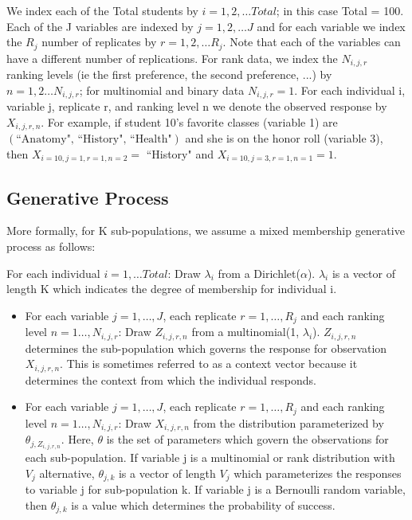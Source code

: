 \documentclass{article}
\begin{document}
We index each of the Total students by $i = 1,2, \ldots Total$; in this case Total = 100. Each of the J variables are indexed by $j = 1,2,\ldots J$ and for each variable we index the $R_j$ number of replicates by $r = 1,2,\ldots R_j$. Note that each of the variables can have a different number of replications. For rank data, we index the $N_{i,j,r}$ ranking levels (ie the first preference, the second preference, ...) by $n = 1,2\ldots N_{i,j,r}$; for multinomial and binary data $N_{i,j,r} = 1$. For each individual i, variable j, replicate r, and ranking level n we denote the observed response by $X_{i,j,r,n}$. For example, if student 10's favorite classes (variable 1)  are $ \left(\text{``Anatomy", ``History", ``Health"}\right)$ and she is on the honor roll (variable 3), then $X_{i = 10,j = 1,r = 1,n = 2} =$ ``History" and  $X_{i = 10,j = 3,r = 1,n = 1} = 1$.    

\subsection{Generative Process}\label{generative}
More formally, for K sub-populations, we assume a mixed membership generative process as follows:

\noindent
For each individual $i = 1,\ldots Total$: Draw $\lambda_i$ from a Dirichlet($\alpha$). $\lambda_i$ is a vector of length K which indicates the degree of membership for individual i.
  \begin{itemize}
  \item For each variable $j = 1, \ldots, J$, each replicate $r = 1, \dots, R_j$ and each ranking level $n = 1\ldots, N_{i,j,r}$: Draw $Z_{i,j,r,n}$ from a multinomial(1, $\lambda_i$). $Z_{i,j,r,n}$ determines the sub-population which governs the response for observation $X_{i,j,r,n}$. This is sometimes referred to as a context vector because it determines the context from which the individual responds.
  \item For each variable $j = 1, \ldots, J$, each replicate $r = 1, \dots, R_j$ and each ranking level $n = 1\ldots, N_{i,j,r}$: Draw $X_{i,j,r,n}$ from the distribution parameterized by $\theta_{j,Z_{i,j,r,n}}$. Here, $\theta$ is the set of parameters which govern the observations for each sub-population. If variable j is a multinomial or rank distribution with $V_j$ alternative, $\theta_{j,k}$ is a vector of length $V_j$ which parameterizes the responses to variable j for sub-population k. If variable j is a Bernoulli random variable, then $\theta_{j,k}$ is a value which determines the probability of success. 
  \end{itemize}
  
\end{document}
